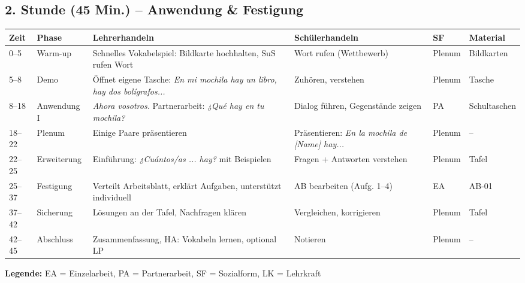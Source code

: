 \documentclass[11pt,a4paper]{article}
\begin{document}
\subsection{2. Stunde (45 Min.) -- Anwendung \& Festigung}

\begin{longtable}{|p{0.8cm}|p{1.3cm}|p{4.2cm}|p{3.2cm}|p{1.5cm}|p{1.8cm}|}
\hline
\textbf{Zeit} & \textbf{Phase} & \textbf{Lehrerhandeln} & \textbf{Schülerhandeln} & \textbf{SF} & \textbf{Material} \\
\hline
\endhead

0--5 & Warm-up & Schnelles Vokabelspiel: Bildkarte hochhalten, SuS rufen Wort & Wort rufen (Wettbewerb) & Plenum & Bildkarten \\
\hline

5--8 & Demo & Öffnet eigene Tasche: \textit{En mi mochila hay un libro, hay dos bolígrafos...} & Zuhören, verstehen & Plenum & Tasche \\
\hline

8--18 & Anwen\-dung I & \textit{Ahora vosotros.} Partnerarbeit: \textit{¿Qué hay en tu mochila?} & Dialog führen, Gegenstände zeigen & PA & Schultaschen \\
\hline

18--22 & Plenum & Einige Paare präsentieren & Präsentieren: \textit{En la mochila de [Name] hay...} & Plenum & -- \\
\hline

22--25 & Erwei\-terung & Einführung: \textit{¿Cuántos/as ... hay?} mit Beispielen & Fragen + Antworten verstehen & Plenum & Tafel \\
\hline

25--37 & Festigung & Verteilt Arbeitsblatt, erklärt Aufgaben, unterstützt individuell & AB bearbeiten (Aufg. 1--4) & EA & AB-01 \\
\hline

37--42 & Sicherung & Lösungen an der Tafel, Nachfragen klären & Vergleichen, korrigieren & Plenum & Tafel \\
\hline

42--45 & Abschluss & Zusammenfassung, HA: Vokabeln lernen, optional LP & Notieren & Plenum & -- \\
\hline
\end{longtable}

\textbf{Legende:} EA = Einzelarbeit, PA = Partnerarbeit, SF = Sozialform, LK = Lehrkraft

\end{document}
